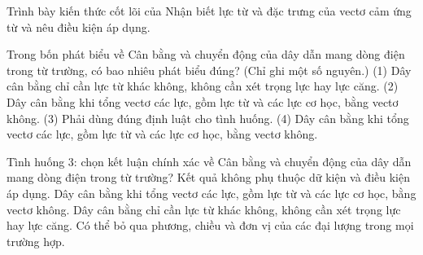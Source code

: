 \begin{bt}
Trình bày kiến thức cốt lõi của Nhận biết lực từ và đặc trưng của vectơ cảm ứng từ và nêu điều kiện áp dụng.
\end{bt}

\begin{ex}
Trong bốn phát biểu về Cân bằng và chuyển động của dây dẫn mang dòng điện trong từ trường, có bao nhiêu phát biểu đúng? (Chỉ ghi một số nguyên.) (1) Dây cân bằng chỉ cần lực từ khác không, không cần xét trọng lực hay lực căng. (2) Dây cân bằng khi tổng vectơ các lực, gồm lực từ và các lực cơ học, bằng vectơ không. (3) Phải dùng đúng định luật cho tình huống. (4) Dây cân bằng khi tổng vectơ các lực, gồm lực từ và các lực cơ học, bằng vectơ không.
\end{ex}

\begin{ex}
Tình huống 3: chọn kết luận chính xác về Cân bằng và chuyển động của dây dẫn mang dòng điện trong từ trường?
\choice
{Kết quả không phụ thuộc dữ kiện và điều kiện áp dụng.}
{\True Dây cân bằng khi tổng vectơ các lực, gồm lực từ và các lực cơ học, bằng vectơ không.}
{Dây cân bằng chỉ cần lực từ khác không, không cần xét trọng lực hay lực căng.}
{Có thể bỏ qua phương, chiều và đơn vị của các đại lượng trong mọi trường hợp.}
\end{ex}

